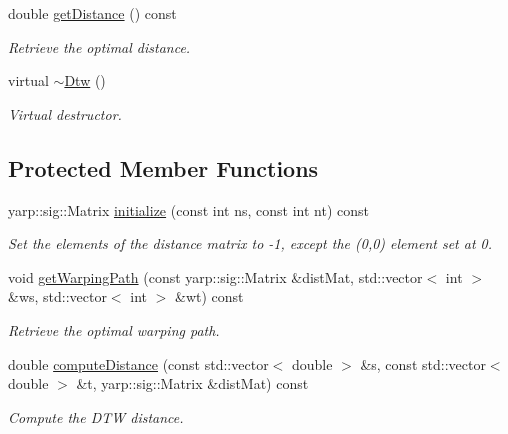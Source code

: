 \begin{DoxyCompactItemize}
double \hyperlink{classassistive__rehab_1_1Dtw_ab530a2ea914ddab06899dfc511a13eed}{get\+Distance} () const
\begin{DoxyCompactList}\small\item\em Retrieve the optimal distance. \end{DoxyCompactList}\item 
\mbox{\label{classassistive__rehab_1_1Dtw_a8d81b36760d197ede52df4c47bedb3ab}} 
virtual \hyperlink{classassistive__rehab_1_1Dtw_a8d81b36760d197ede52df4c47bedb3ab}{$\sim$\+Dtw} ()
\begin{DoxyCompactList}\small\item\em Virtual destructor. \end{DoxyCompactList}\end{DoxyCompactItemize}
\subsection*{Protected Member Functions}
\begin{DoxyCompactItemize}
\item 
yarp\+::sig\+::\+Matrix \hyperlink{classassistive__rehab_1_1Dtw_a9b3ce7097b8646230f2f9a918126bbef}{initialize} (const int ns, const int nt) const
\begin{DoxyCompactList}\small\item\em Set the elements of the distance matrix to -\/1, except the (0,0) element set at 0. \end{DoxyCompactList}\item 
void \hyperlink{classassistive__rehab_1_1Dtw_ab5e7ac2f9658d042c39c0801def854e7}{get\+Warping\+Path} (const yarp\+::sig\+::\+Matrix \&dist\+Mat, std\+::vector$<$ int $>$ \&ws, std\+::vector$<$ int $>$ \&wt) const
\begin{DoxyCompactList}\small\item\em Retrieve the optimal warping path. \end{DoxyCompactList}\item 
double \hyperlink{classassistive__rehab_1_1Dtw_a05a9a7736a0c162303d15ff4f7936b50}{compute\+Distance} (const std\+::vector$<$ double $>$ \&s, const std\+::vector$<$ double $>$ \&t, yarp\+::sig\+::\+Matrix \&dist\+Mat) const
\begin{DoxyCompactList}\small\item\em Compute the D\+TW distance. \end{DoxyCompactList}\end{DoxyCompactItemize}

